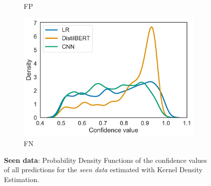 \begin{figure}[t]
\begin{subfigure}{.49\textwidth}
        \caption{FP}
    \end{subfigure}
    \begin{subfigure}{.49\textwidth}
        \includegraphics[scale=.4]{Figures/confidence-densities-seen-fn.pdf}
        \caption{FN}
    \end{subfigure}
    \caption{\textbf{Seen data}: Probability Density Functions of the confidence values of all predictions for the \emph{seen data} estimated with Kernel Density Estimation.}
    \label{fig:pdfs-seen}
\end{figure}

